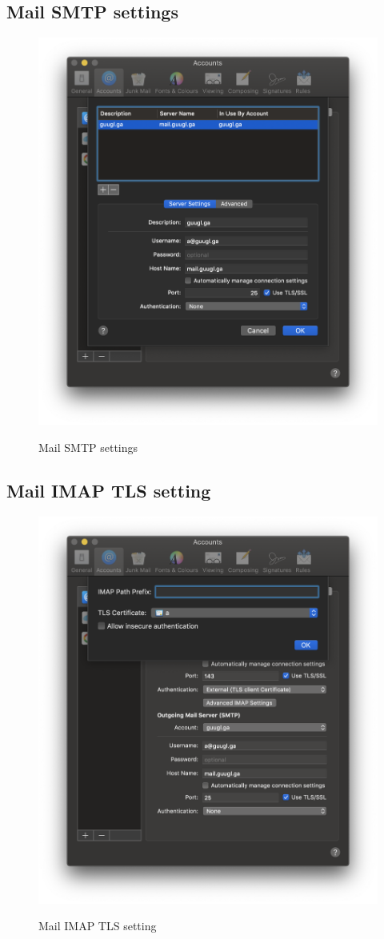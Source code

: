 \subsection{Mail SMTP settings}
\begin{figure}[H]
        \centering
        \includegraphics[width=0.8\linewidth]{pics/email_client_SMTP_server_settings}
        \label{fig:mailsmtpsetting}
                \caption{Mail SMTP settings}
\end{figure}

\subsection{Mail IMAP TLS setting}
\begin{figure}[H]
        \centering
        \includegraphics[width=0.8\linewidth]{pics/email_client_IMAP_TLS_settings}
        \label{fig:mailimaptlssetting}
                \caption{Mail IMAP TLS setting}
\end{figure}
